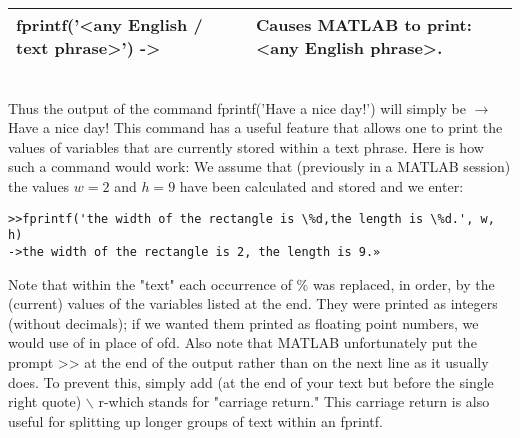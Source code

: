 \documentclass[../main.tex]{subfiles}
\begin{document}
\begin{tabular}{|l|l|}
\hline fprintf('<any English / text phrase>') -> & Causes MATLAB to print: <any English phrase>. \\
\hline
\end{tabular}\\

Thus the output of the command fprintf('Have a nice day!') will simply be $\rightarrow$ Have a nice day! This command has a useful feature that allows one to print the values of variables that are currently stored within a text phrase. Here is how such a command would work: We assume that (previously in a MATLAB session) the values $w=2$ and $h=9$ have been calculated and stored and we enter:

\begin{verbatim}
>>fprintf('the width of the rectangle is \%d,the length is \%d.', w, h)
->the width of the rectangle is 2, the length is 9.»
\end{verbatim}

Note that within the "text" each occurrence of \% was replaced, in order, by the (current) values of the variables listed at the end. They were printed as integers (without decimals); if we wanted them printed as floating point numbers, we would use of in place of ofd. Also note that MATLAB unfortunately put the prompt >> at the end of the output rather than on the next line as it usually does. To prevent this, simply add (at the end of your text but before the single right quote) $\backslash$ r-which stands for "carriage return." This carriage return is also useful for splitting up longer groups of text within an fprintf.\\
\end{document}
